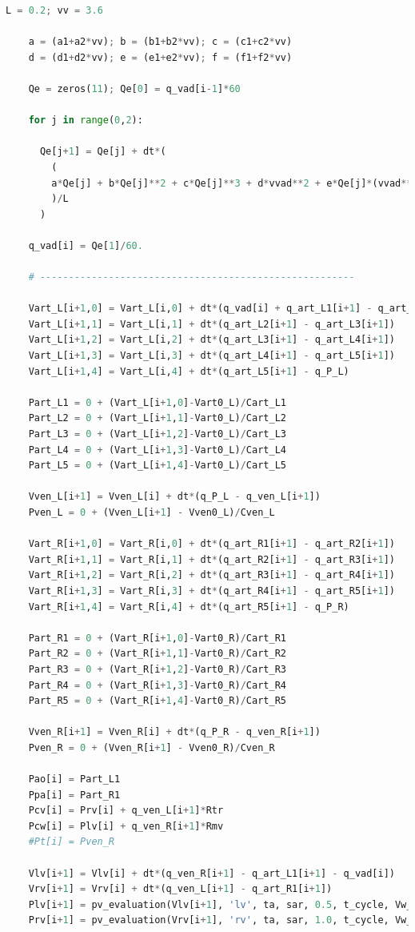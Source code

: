 \begin{lstlisting}[language=Python,caption={Математическая модель сердечно-сосудистой системы на языке программирования Python},label={list:cardiovascular_system_model}]
    L = 0.2; vv = 3.6
    
    a = (a1+a2*vv); b = (b1+b2*vv); c = (c1+c2*vv)
    d = (d1+d2*vv); e = (e1+e2*vv); f = (f1+f2*vv)

    Qe = zeros(11); Qe[0] = q_vad[i-1]*60

    for j in range(0,2):

      Qe[j+1] = Qe[j] + dt*(
        (
        a*Qe[j] + b*Qe[j]**2 + c*Qe[j]**3 + d*vvad**2 + e*Qe[j]*(vvad**2) + f*vvad*(Qe[j]**2) + g1 + g2*vv - dP\
        )/L 
      )

    q_vad[i] = Qe[1]/60.

    # -------------------------------------------------------

    Vart_L[i+1,0] = Vart_L[i,0] + dt*(q_vad[i] + q_art_L1[i+1] - q_art_L2[i+1])
    Vart_L[i+1,1] = Vart_L[i,1] + dt*(q_art_L2[i+1] - q_art_L3[i+1])
    Vart_L[i+1,2] = Vart_L[i,2] + dt*(q_art_L3[i+1] - q_art_L4[i+1])
    Vart_L[i+1,3] = Vart_L[i,3] + dt*(q_art_L4[i+1] - q_art_L5[i+1])
    Vart_L[i+1,4] = Vart_L[i,4] + dt*(q_art_L5[i+1] - q_P_L)

    Part_L1 = 0 + (Vart_L[i+1,0]-Vart0_L)/Cart_L1 
    Part_L2 = 0 + (Vart_L[i+1,1]-Vart0_L)/Cart_L2 
    Part_L3 = 0 + (Vart_L[i+1,2]-Vart0_L)/Cart_L3 
    Part_L4 = 0 + (Vart_L[i+1,3]-Vart0_L)/Cart_L4 
    Part_L5 = 0 + (Vart_L[i+1,4]-Vart0_L)/Cart_L5

    Vven_L[i+1] = Vven_L[i] + dt*(q_P_L - q_ven_L[i+1]) 
    Pven_L = 0 + (Vven_L[i+1] - Vven0_L)/Cven_L

    Vart_R[i+1,0] = Vart_R[i,0] + dt*(q_art_R1[i+1] - q_art_R2[i+1])
    Vart_R[i+1,1] = Vart_R[i,1] + dt*(q_art_R2[i+1] - q_art_R3[i+1])
    Vart_R[i+1,2] = Vart_R[i,2] + dt*(q_art_R3[i+1] - q_art_R4[i+1])
    Vart_R[i+1,3] = Vart_R[i,3] + dt*(q_art_R4[i+1] - q_art_R5[i+1])
    Vart_R[i+1,4] = Vart_R[i,4] + dt*(q_art_R5[i+1] - q_P_R)

    Part_R1 = 0 + (Vart_R[i+1,0]-Vart0_R)/Cart_R1 
    Part_R2 = 0 + (Vart_R[i+1,1]-Vart0_R)/Cart_R2 
    Part_R3 = 0 + (Vart_R[i+1,2]-Vart0_R)/Cart_R3 
    Part_R4 = 0 + (Vart_R[i+1,3]-Vart0_R)/Cart_R4
    Part_R5 = 0 + (Vart_R[i+1,4]-Vart0_R)/Cart_R5 

    Vven_R[i+1] = Vven_R[i] + dt*(q_P_R - q_ven_R[i+1]) 
    Pven_R = 0 + (Vven_R[i+1] - Vven0_R)/Cven_R 

    Pao[i] = Part_L1
    Ppa[i] = Part_R1
    Pcv[i] = Prv[i] + q_ven_L[i+1]*Rtr
    Pcw[i] = Plv[i] + q_ven_R[i+1]*Rmv
    #Pt[i] = Pven_R
    
    Vlv[i+1] = Vlv[i] + dt*(q_ven_R[i+1] - q_art_L1[i+1] - q_vad[i])
    Vrv[i+1] = Vrv[i] + dt*(q_ven_L[i+1] - q_art_R1[i+1])
    Plv[i+1] = pv_evaluation(Vlv[i+1], 'lv', ta, sar, 0.5, t_cycle, Vw_lv, V0_lv)
    Prv[i+1] = pv_evaluation(Vrv[i+1], 'rv', ta, sar, 1.0, t_cycle, Vw_rv, V0_rv)


\end{lstlisting}
